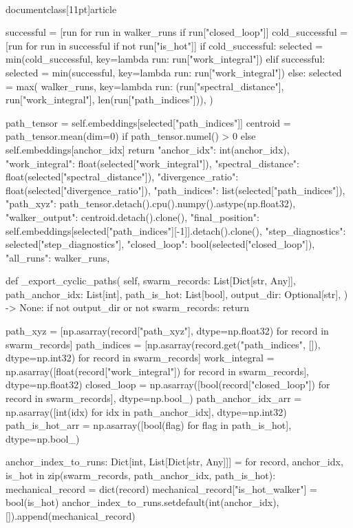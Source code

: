 \\documentclass[11pt]{article}
\begin{document}
\begin{CodeBlock}
        successful = [run for run in walker_runs if run["closed_loop"]]
        cold_successful = [run for run in successful if not run["is_hot"]]
        if cold_successful:
            selected = min(cold_successful, key=lambda run: run["work_integral"])
        elif successful:
            selected = min(successful, key=lambda run: run["work_integral"])
        else:
            selected = max(
                walker_runs,
                key=lambda run: (run["spectral_distance"], run["work_integral"], len(run["path_indices"])),
            )

        path_tensor = self.embeddings[selected["path_indices"]]
        centroid = path_tensor.mean(dim=0) if path_tensor.numel() > 0 else self.embeddings[anchor_idx]
        return {
            "anchor_idx": int(anchor_idx),
            "work_integral": float(selected["work_integral"]),
            "spectral_distance": float(selected["spectral_distance"]),
            "divergence_ratio": float(selected["divergence_ratio"]),
            "path_indices": list(selected["path_indices"]),
            "path_xyz": path_tensor.detach().cpu().numpy().astype(np.float32),
            "walker_output": centroid.detach().clone(),
            "final_position": self.embeddings[selected["path_indices"][-1]].detach().clone(),
            "step_diagnostics": selected["step_diagnostics"],
            "closed_loop": bool(selected["closed_loop"]),
            "all_runs": walker_runs,
        }

    def _export_cyclic_paths(
        self,
        swarm_records: List[Dict[str, Any]],
        path_anchor_idx: List[int],
        path_is_hot: List[bool],
        output_dir: Optional[str],
    ) -> None:
        if not output_dir or not swarm_records:
            return

        path_xyz = [np.asarray(record["path_xyz"], dtype=np.float32) for record in swarm_records]
        path_indices = [np.asarray(record.get("path_indices", []), dtype=np.int32) for record in swarm_records]
        work_integral = np.asarray([float(record["work_integral"]) for record in swarm_records], dtype=np.float32)
        closed_loop = np.asarray([bool(record["closed_loop"]) for record in swarm_records], dtype=np.bool_)
        path_anchor_idx_arr = np.asarray([int(idx) for idx in path_anchor_idx], dtype=np.int32)
        path_is_hot_arr = np.asarray([bool(flag) for flag in path_is_hot], dtype=np.bool_)

        anchor_index_to_runs: Dict[int, List[Dict[str, Any]]] = {}
        for record, anchor_idx, is_hot in zip(swarm_records, path_anchor_idx, path_is_hot):
            mechanical_record = dict(record)
            mechanical_record["is_hot_walker"] = bool(is_hot)
            anchor_index_to_runs.setdefault(int(anchor_idx), []).append(mechanical_record)


\end{CodeBlock}
\end{document}
